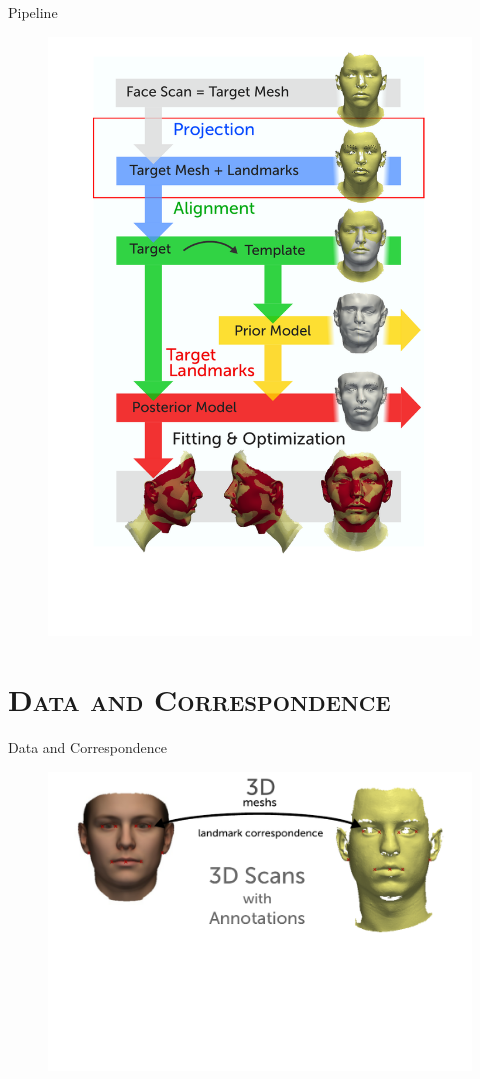 \documentclass[xcolor=x11names,compress]{beamer}
\begin{document}
    \begin{frame}{Pipeline}
        \begin{figure}
            \includegraphics[width=.5\textwidth]{../resources/figures/pipeline_linefeature.pdf}
        \end{figure}
    \end{frame}

    \section{\scshape Data and Correspondence}
    \begin{frame}{Data and Correspondence}
        \begin{figure}
            \includegraphics[width=.9\textwidth]{../resources/figures/givendata1.pdf}
        \end{figure}
    \end{frame}
\end{document}
